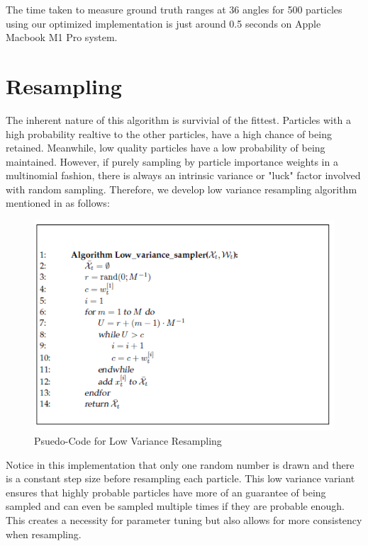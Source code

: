 \documentclass[12pt, a4paper]{article}
\begin{document}
\begin{itemize}
\begin{itemize}
\begin{minipage}[t]{\linewidth}
\begin{center}
        \label{fig:sm_1}
      \end{center}
    \end{minipage}
  \end{itemize}
\end{itemize}
The time taken to measure ground truth ranges at 36 angles for 500 particles using our optimized implementation is just around 0.5 seconds on Apple Macbook M1 Pro system.


\clearpage
\section{Resampling}
The inherent nature of this algorithm is survivial of the fittest. Particles with a high probability realtive to the other particles, have a high chance of being retained. Meanwhile, low quality particles have a low probability of being maintained. However, if purely sampling by particle importance weights in a multinomial fashion, there is always an intrinsic variance or "luck" factor involved with random sampling. Therefore, we develop  low variance resampling algorithm mentioned in \cite{ProbRob} as follows:

\begin{figure}[!htb]
  \center
  \includegraphics{LowVarianceResampling.png}
  \caption{Psuedo-Code for Low Variance Resampling \cite{ProbRob}}
\end{figure}

Notice in this implementation that only one random number is drawn and there is a constant step size before resampling each particle. This low variance variant ensures that highly probable particles have more of an guarantee of being sampled and can even be sampled multiple times if they are probable enough. This creates a necessity for parameter tuning but also allows for more consistency when resampling.
\end{document}
